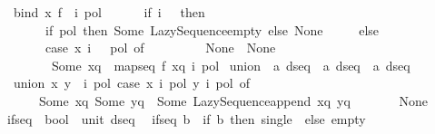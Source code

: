 \begin{isabellebody}
\isanewline
\ \ {\isachardoublequoteopen}bind\ x\ f\ {\isacharequal}{\kern0pt}\ {\isacharparenleft}{\kern0pt}{\isasymlambda}i\ pol{\isachardot}{\kern0pt}\ \isanewline
\ \ \ \ \ if\ i\ {\isacharequal}{\kern0pt}\ {}\ then\isanewline
\ \ \ \ \ \ \ {\isacharparenleft}{\kern0pt}if\ pol\ then\ Some\ Lazy{\isacharunderscore}{\kern0pt}Sequence{\isachardot}{\kern0pt}empty\ else\ None{\isacharparenright}{\kern0pt}\isanewline
\ \ \ \ \ else\isanewline
\ \ \ \ \ \ \ {\isacharparenleft}{\kern0pt}case\ x\ {\isacharparenleft}{\kern0pt}i\ {\isacharminus}{\kern0pt}\ {}{\isacharparenright}{\kern0pt}\ pol\ of\isanewline
\ \ \ \ \ \ \ \ \ None\ {\isasymRightarrow}\ None\isanewline
\ \ \ \ \ \ \ {\isacharbar}{\kern0pt}\ Some\ xq\ {\isasymRightarrow}\ map{\isacharunderscore}{\kern0pt}seq\ f\ xq\ i\ pol{\isacharparenright}{\kern0pt}{\isacharparenright}{\kern0pt}{\isachardoublequoteclose}\isanewline
\isanewline
{}\isamarkupfalse%
\ union\ {\isacharcolon}{\kern0pt}{\isacharcolon}{\kern0pt}\ {\isachardoublequoteopen}{\isacharprime}{\kern0pt}a\ dseq\ {\isasymRightarrow}\ {\isacharprime}{\kern0pt}a\ dseq\ {\isasymRightarrow}\ {\isacharprime}{\kern0pt}a\ dseq{\isachardoublequoteclose}\isanewline
{}\isanewline
\ \ {\isachardoublequoteopen}union\ x\ y\ {\isacharequal}{\kern0pt}\ {\isacharparenleft}{\kern0pt}{\isasymlambda}i\ pol{\isachardot}{\kern0pt}\ case\ {\isacharparenleft}{\kern0pt}x\ i\ pol{\isacharcomma}{\kern0pt}\ y\ i\ pol{\isacharparenright}{\kern0pt}\ of\isanewline
\ \ \ \ \ \ {\isacharparenleft}{\kern0pt}Some\ xq{\isacharcomma}{\kern0pt}\ Some\ yq{\isacharparenright}{\kern0pt}\ {\isasymRightarrow}\ Some\ {\isacharparenleft}{\kern0pt}Lazy{\isacharunderscore}{\kern0pt}Sequence{\isachardot}{\kern0pt}append\ xq\ yq{\isacharparenright}{\kern0pt}\isanewline
\ \ \ \ {\isacharbar}{\kern0pt}\ {\isacharunderscore}{\kern0pt}\ {\isasymRightarrow}\ None{\isacharparenright}{\kern0pt}{\isachardoublequoteclose}\isanewline
\isanewline
{}\isamarkupfalse%
\ if{\isacharunderscore}{\kern0pt}seq\ {\isacharcolon}{\kern0pt}{\isacharcolon}{\kern0pt}\ {\isachardoublequoteopen}bool\ {\isasymRightarrow}\ unit\ dseq{\isachardoublequoteclose}\isanewline
{}\isanewline
\ \ {\isachardoublequoteopen}if{\isacharunderscore}{\kern0pt}seq\ b\ {\isacharequal}{\kern0pt}\ {\isacharparenleft}{\kern0pt}if\ b\ then\ single\ {\isacharparenleft}{\kern0pt}{\isacharparenright}{\kern0pt}\ else\ empty{\isacharparenright}{\kern0pt}{\isachardoublequoteclose}\isanewline
\isanewline
{}\isamarkupfalse%

\end{isabellebody}
